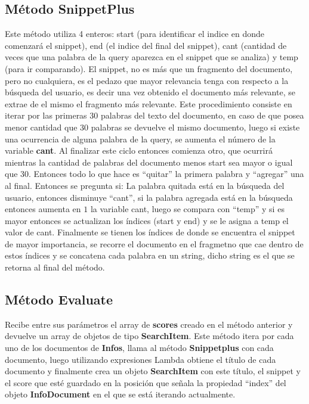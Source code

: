 \documentclass[10pt,a4paper]{article}
\begin{document}
\subsection{M\'etodo SnippetPlus}
\setlength{\parindent}{1em} Este m\'etodo utiliza 4 enteros: start (para identificar el indice en donde comenzar\'a el snippet), end (el indice del final del snippet), cant (cantidad de veces que una palabra de la query aparezca en el snippet que se analiza) y temp (para ir comparando). El snippet, no es m\'as que un fragmento del documento, pero no cualquiera, es el pedazo que mayor relevancia tenga con respecto a la b\'usqueda del usuario, es decir una vez obtenido el documento m\'as relevante, se extrae de el mismo el fragmento m\'as relevante. Este procedimiento consiste en iterar por las primeras 30 palabras del texto del documento, en caso de que posea menor cantidad que 30 palabras se devuelve el mismo documento, luego si existe una ocurrencia de alguna palabra de la query, se aumenta el n\'umero de la variable \textbf{cant}. Al finalizar este ciclo entonces comienza otro, que ocurrir\'a mientras la cantidad de palabras del documento menos start sea mayor o igual que 30. Entonces todo lo que hace es ``quitar'' la primera palabra y ``agregar'' una al final. Entonces se pregunta si: La palabra quitada est\'a en la b\'usqueda del usuario, entonces disminuye ``cant'', si la palabra agregada est\'a en la b\'usqueda entonces aumenta en $1$ la variable cant, luego se compara con ``temp'' y si es mayor entonces se actualizan los \'indices (start y end) y se le asigna a temp el valor de cant. Finalmente se tienen los \'indices de donde se encuentra el snippet de mayor importancia, se recorre el documento en el fragmetno que cae dentro de estos \'indices y se concatena cada palabra en un string, dicho string es el que se retorna al final del m\'etodo. 

\subsection{M\'etodo Evaluate}
\setlength{\parindent}{1em} Recibe entre sus par\'ametros el array de \textbf{scores} creado en el m\'etodo anterior y devuelve un array de objetos de tipo \textbf{SearchItem}. Este m\'etodo itera por cada uno de los documentos de \textbf{Infos}, llama al m\'etodo \textbf{Snippetplus} con cada documento, luego utilizando expresiones Lambda obtiene el t\'itulo de cada documento y finalmente crea un objeto \textbf{SearchItem} con este t\'itulo, el snippet y el score que est\'e guardado en la posici\'on que se\~nala la propiedad ``index'' del objeto \textbf{InfoDocument} en el que se est\'a iterando actualmente.
\end{document}
